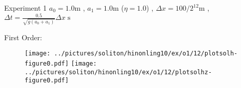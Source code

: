 \documentclass[pdf]{beamer}
\begin{document}









\begin{frame}{Experiment 1}
$a_0 = 1.0\text{m}$ , $a_1 = 1.0\text{m}$ ($\eta = 1.0$) , $\Delta x = 100 /2^{12}\text{m}$ , $\Delta t = \frac{0.5}{\sqrt{g (a_0 + a_1)}} \Delta x \; \text{s}$

First Order:

\begin{figure}
\texttt{[image: ../pictures/soliton/hinonling10/ex/o1/12/plotsolh-figure0.pdf]}
\texttt{[image: ../pictures/soliton/hinonling10/ex/o1/12/plotsolhz-figure0.pdf]}
\end{figure}
\end{frame}
\end{document}
